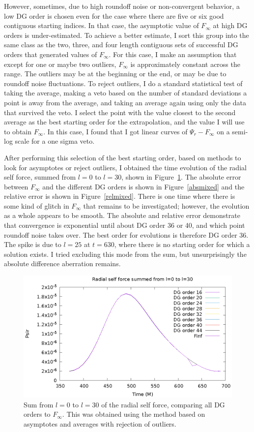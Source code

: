 However, sometimes, due to high roundoff noise or non-convergent behavior, a low DG order is chosen even for the case where there are five or six good contiguous starting indices. In that case, the asymptotic value of $F_\infty$ at high DG orders is under-estimated. To achieve a better estimate, I sort this group into the same class as the two, three, and four length contiguous sets of successful DG orders that generated values of $F_\infty$. For this case, I make an assumption that except for one or maybe two outliers, $F_\infty$ is approximately constant across the range. The outliers may be at the beginning or the end, or may be due to roundoff noise fluctuations. To reject outliers, I do a standard statistical test of taking the average, making a veto based on the number of standard deviations a point is away from the average, and taking an average again using only the data that survived the veto. I select the point with the value closest to the second average as the best starting order for the extrapolation, and the value I will use to obtain $F_\infty$. In this case, I found that I got linear curves of $\Psi_r-F_\infty$ on a semi-log scale for a one sigma veto.

After performing this selection of the best starting order, based on methods to look for asymptotes or reject outliers, I obtained the time evolution of the radial self force, summed from $l=0$ to $l=30$, shown in Figure~\ref{summixed}. The absolute error between $F_\infty$ and the different DG orders is shown in Figure~\ref{absmixed} and the relative error is shown in Figure~\ref{relmixed}. There is one time where there is some kind of glitch in $F_\infty$ that remains to be investigated; however, the evolution as a whole appears to be smooth. The absolute and relative error demonstrate that convergence is exponential until about DG order 36 or 40, and which point roundoff noise takes over. The best order for evolutions is therefore DG order 36. The spike is due to $l=25$ at $t=630$, where there is no starting order for which a solution exists. I tried excluding this mode from the sum, but unsurprisingly the absolute difference aberration remains.

\begin{figure}
\includegraphics{psirvtwfinfdgorders}
\caption{Sum from $l=0$ to $l=30$ of the radial self force, comparing all DG orders to $F_\infty$. This was obtained using the method based on asymptotes and averages with rejection of outliers.}
\label{summixed}
\end{figure}

